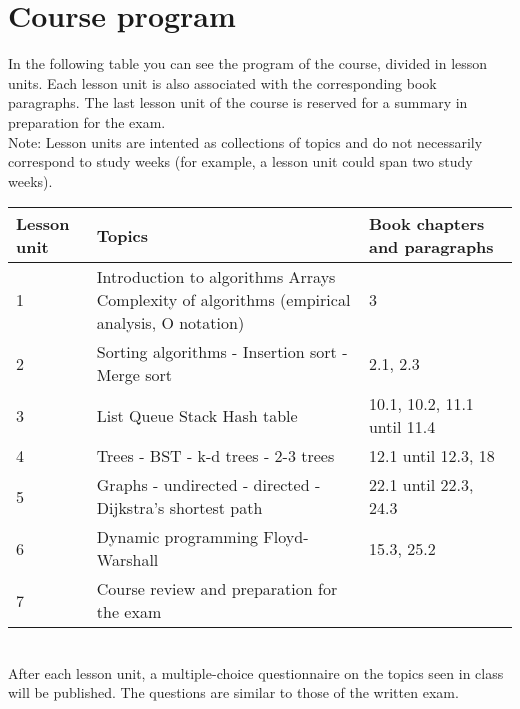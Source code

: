 \section{Course program}
	
	In the following table you can see the program of the course, divided in lesson units. Each lesson unit is also associated with the corresponding book paragraphs. The last lesson unit of the course is reserved for a summary in preparation for the exam. \\
	Note: Lesson units are intented as collections of topics and do not necessarily correspond to study weeks (for example, a lesson unit could span two study weeks). \\
	
	\begin{tabular}{ | p{1.2cm} | p{10cm} | p{2.7cm} | }
		\hline
	  	\textbf{Lesson unit} & \textbf{Topics} & \textbf{Book chapters and paragraphs} \\
	  	\hline
  		1 & Introduction to algorithms \newline Arrays \newline Complexity of algorithms (empirical analysis, O notation) & 3 \\
  		\hline
  		2 & Sorting algorithms \newline - Insertion sort \newline - Merge sort & 2.1, 2.3 \\
  		\hline
  		3 & List \newline Queue \newline Stack \newline Hash table &  10.1, 10.2, 11.1 until 11.4 \\
  		\hline
  		4 & Trees \newline - BST \newline - k-d trees \newline - 2-3 trees & 12.1 until 12.3, 18 \\
  		\hline
  		5 & Graphs \newline - undirected \newline - directed \newline - Dijkstra's shortest path & 22.1 until 22.3, 24.3 \\
  		\hline
  		6 & Dynamic programming \newline Floyd-Warshall & 15.3, 25.2\\
  		\hline
  		7 & Course review and preparation for the exam & \\
  		\hline
	\end{tabular}
\begin{comment}
  		4 & Binary search trees & 3.2 \\
  		\hline
  		5 & Balanced search trees: 2-3 search trees & 3.3 \\
  		\hline
  		6 & Graphs (undirected; directed; Dijkstra shortest path) & 4.1, 4.2, 4.4 \\
  		\hline
  		7 & Dynamic programming; Floyd-Warshall & Not covered by the book, see slides or Cormen\\
  		\hline
  		8 & Course recap & \\
  		\hline
\end{comment}

\noindent
\\
After each lesson unit, a multiple-choice questionnaire on the topics seen in class will be published. The questions are similar to those of the written exam.